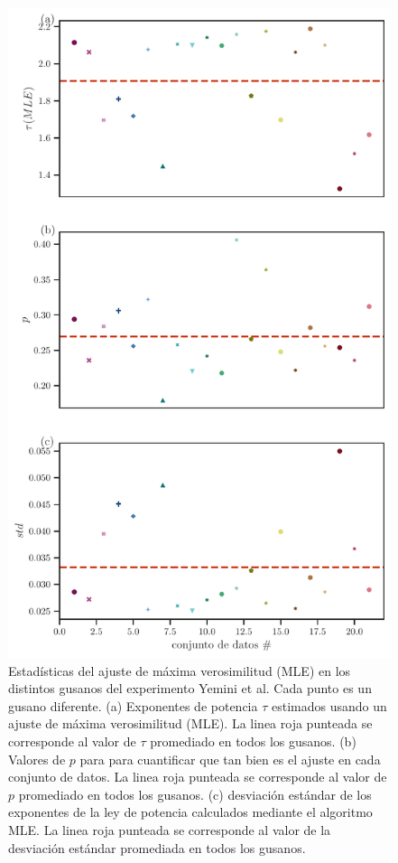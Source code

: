  
  \begin{figure}[h!]
 	\centering\includegraphics[width=\imsize]{exponentes_experimentos2.pdf}
 	\caption[ Estadísticas del ajuste  de máxima verosimilitud (MLE) en los distintos gusanos del  experimento  Yemini et al. ]{ Estadísticas del ajuste  de máxima verosimilitud (MLE) en los distintos gusanos del  experimento  Yemini et al. Cada punto es un gusano diferente. (a) Exponentes de potencia $\tau$ estimados usando un ajuste de máxima verosimilitud (MLE). La linea roja punteada se corresponde al valor de $\tau$ promediado en todos los gusanos. (b) Valores de $p$ para  para cuantificar  que tan bien es el ajuste en cada conjunto de datos. La linea roja punteada se corresponde al valor de $p$ promediado en todos los gusanos. (c) desviación estándar de los exponentes de la ley de potencia calculados mediante el algoritmo MLE. La linea roja punteada se corresponde al valor de la desviación estándar  promediada en todos los gusanos. } \label{fig:exponentes_experimentos2}
 \end{figure}
 
